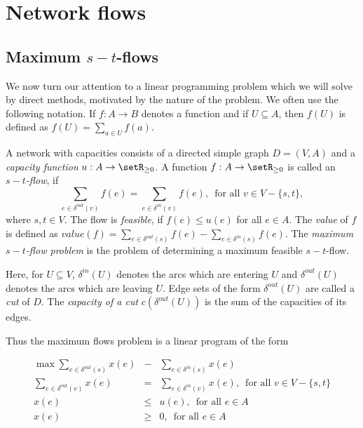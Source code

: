 \chapter{Network flows}
\label{sec:flows}


\section{Maximum $s-t$-flows}
\label{sec:maximum-s-t}

We now turn our attention to a linear programming problem which we
will solve by direct methods, motivated by the nature of the
problem. We often use the following notation. If $f:A\longrightarrow B$ denotes a
function and if $U\subseteq A$, then $f(U)$ is defined as $f(U)= \sum_{a\in U} f(a)$. 




\begin{definition}
  A network with capacities  consists of a directed simple graph
  $D=(V,A)$ and a   \emph{capacity function} $u:A\to\setR_{\geq0}$.  A function
  $f:A\to\setR_{\geq0}$ is   called an \emph{$s-t$-flow}, if 
  \begin{equation}
    \sum_{e \in \delta^{out}(v)} f(e) = \sum_{e \in \delta^{in}(v)} f(e), \, \mbox{ for all } v \in V-\{s,t\},
  \end{equation}
  where $s,t\in V$. The flow is \emph{feasible}, if $f(e) \leq u(e)$ for all
  $e \in A$. 
  The \emph{value} of $f$ is defined as 
  $value(f) =  \sum_{e \in \delta^{out}(s)} f(e) - \sum_{e \in \delta^{in}(s)} f(e)$.
  The \emph{maximum $s-t$-flow problem} is the problem of determining
  a maximum feasible $s-t$-flow. 
\end{definition}


Here, for $U \subseteq V$, $\delta^{in}(U)$ denotes the arcs which are entering $U$
and $\delta^{out}(U)$ denotes the arcs which are leaving $U$.   Edge sets
of the form $\delta^{out}(U)$   are called a \emph{cut} of $D$. The
\emph{capacity of a cut } $c(\delta^{out}(U))$ is the sum of the capacities of
its edges. 


Thus the maximum  flows problem is a linear program of the form 

\begin{eqnarray}
  \max \sum_{e \in \delta^{out}(s)} x(e) & - &   \sum_{e \in \delta^{in}(s)} x(e) \\
   \sum_{e \in \delta^{out}(v)} x(e) & = &  \sum_{e \in \delta^{in}(v)} x(e), \, \mbox{ for all
   } v \in V-\{s,t\} \\
   x(e) & \leq & u (e) , \, \mbox{ for all
   } e \in A \\
   x(e) & \geq & 0 , \, \mbox{ for all
   } e \in A \\
\end{eqnarray}



